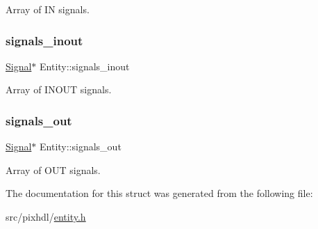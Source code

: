 Array of IN signals. \mbox{\label{struct_entity_a3a7a0540c9a581600cae6cb8880d4175}} 
\subsubsection{\texorpdfstring{signals\_inout}{signals\_inout}}
{\footnotesize\ttfamily \mbox{\hyperlink{struct_signal}{Signal}}$\ast$ Entity\+::signals\+\_\+inout}

Array of I\+N\+O\+UT signals. \mbox{\label{struct_entity_a4b9a333d9fb207c09d9f64e87d986ad6}} 
\subsubsection{\texorpdfstring{signals\_out}{signals\_out}}
{\footnotesize\ttfamily \mbox{\hyperlink{struct_signal}{Signal}}$\ast$ Entity\+::signals\+\_\+out}

Array of O\+UT signals. 

The documentation for this struct was generated from the following file\+:\begin{DoxyCompactItemize}
\item 
src/pixhdl/\mbox{\hyperlink{entity_8h}{entity.\+h}}\end{DoxyCompactItemize}
